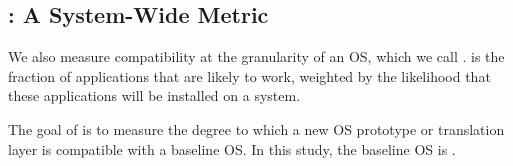 \subsection{\CompatMetric{}: A System-Wide Metric}

We also measure compatibility at the granularity of an OS,
which we call \compatmetric{}.
\Compatmetric{} is the fraction of applications that are likely to work,
weighted by the likelihood that these applications will be installed on a system.

The goal of \compatmetric{} is to measure the degree to which a
new OS prototype or translation layer is compatible with a baseline OS.
In this study, the baseline OS is \osdist{}.



